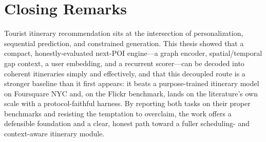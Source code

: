 \section{Closing Remarks}
\label{sec:conc-closing}

Tourist itinerary recommendation sits at the intersection of personalization, sequential
prediction, and constrained generation. This thesis showed that a compact, honestly-evaluated
next-POI engine---a graph encoder, spatial/temporal gap context, a user embedding, and a
recurrent scorer---can be decoded into coherent itineraries simply and effectively, and that
this decoupled route is a stronger baseline than it first appears: it beats a purpose-trained
itinerary model on Foursquare NYC and, on the Flickr benchmark, lands on the literature's own
scale with a protocol-faithful harness. By reporting both tasks on their proper benchmarks and
resisting the temptation to overclaim, the work offers a defensible foundation and a clear,
honest path toward a fuller scheduling- and context-aware itinerary module.
